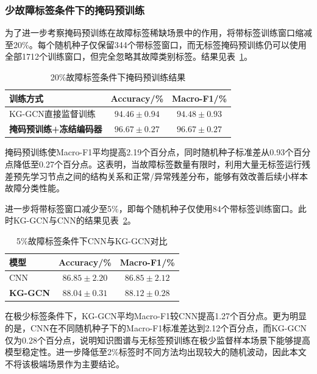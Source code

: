 \subsubsection{少故障标签条件下的掩码预训练}

为了进一步考察掩码预训练在故障标签稀缺场景中的作用，将带标签训练窗口缩减至20\%。每个随机种子仅保留344个带标签窗口，而无标签掩码预训练仍可以使用全部1712个训练窗口，但完全忽略其故障类别标签。结果见表~\ref{tab:pretrain20_v3}。

\begin{table}[htbp]
    \centering
    \caption{20\%故障标签条件下掩码预训练结果}
    \label{tab:pretrain20_v3}
    \begin{tabular}{lcc}
        \toprule
        训练方式 & Accuracy/\% & Macro-F1/\% \\
        \midrule
        KG-GCN直接监督训练 & $94.46\pm0.94$ & $94.48\pm0.93$ \\
        \textbf{掩码预训练+冻结编码器} & $\mathbf{96.67\pm0.27}$ & $\mathbf{96.67\pm0.27}$ \\
        \bottomrule
    \end{tabular}
\end{table}

掩码预训练使Macro-F1平均提高2.19个百分点，同时随机种子标准差从0.93个百分点降低至0.27个百分点。这表明，当故障标签数量有限时，利用大量无标签运行残差预先学习节点之间的结构关系和正常/异常残差分布，能够有效改善后续小样本故障分类性能。

进一步将带标签窗口减少至5\%，即每个随机种子仅使用84个带标签训练窗口。此时KG-GCN与CNN的结果见表~\ref{tab:small05_v3}。

\begin{table}[htbp]
    \centering
    \caption{5\%故障标签条件下CNN与KG-GCN对比}
    \label{tab:small05_v3}
    \begin{tabular}{lcc}
        \toprule
        模型 & Accuracy/\% & Macro-F1/\% \\
        \midrule
        CNN & $86.85\pm2.20$ & $86.85\pm2.12$ \\
        \textbf{KG-GCN} & $\mathbf{88.04\pm0.31}$ & $\mathbf{88.12\pm0.28}$ \\
        \bottomrule
    \end{tabular}
\end{table}

在极少标签条件下，KG-GCN平均Macro-F1较CNN提高1.27个百分点。更为明显的是，CNN在不同随机种子下的Macro-F1标准差达到2.12个百分点，而KG-GCN仅为0.28个百分点，说明知识图谱与无标签预训练在极少监督样本场景下能够提高模型稳定性。进一步降低至2\%标签时不同方法均出现较大的随机波动，因此本文不将该极端场景作为主要结论。

